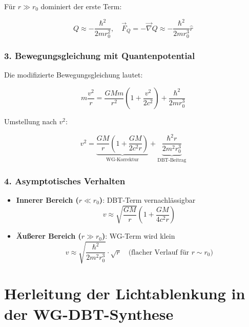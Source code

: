 Für $r \gg r_0$ dominiert der erste Term:

\begin{equation}
Q \approx -\frac{\hbar^2}{2m r_0^2}, \quad \vec{F}_Q = -\vec{\nabla}Q \approx -\frac{\hbar^2}{2m r_0^3}\hat{r}
\end{equation}

\subsubsection{3. Bewegungsgleichung mit Quantenpotential}
Die modifizierte Bewegungsgleichung lautet:

\begin{equation}
m\frac{v^2}{r} = \frac{GMm}{r^2}\left(1 + \frac{v^2}{2c^2}\right) + \frac{\hbar^2}{2m r_0^3}
\end{equation}

Umstellung nach $v^2$:

\begin{equation}
    \boxed
    {
        v^2 = \underbrace{\frac{GM}{r}\left(1 + \frac{GM}{2c^2r}\right)}_{\text{WG-Korrektur}} + \underbrace{\frac{\hbar^2 r}{2m^2 r_0^3}}_{\text{DBT-Beitrag}}
    }
\end{equation}

\subsubsection{4. Asymptotisches Verhalten}
\begin{itemize}
\item \textbf{Innerer Bereich ($r \ll r_0$)}: DBT-Term vernachlässigbar
\begin{equation}
v \approx \sqrt{\frac{GM}{r}} \left(1 + \frac{GM}{4c^2r}\right)
\end{equation}

\item \textbf{Äußerer Bereich ($r \gg r_0$)}: WG-Term wird klein
\begin{equation}
v \approx \sqrt{\frac{\hbar^2}{2m^2 r_0^3}} \cdot \sqrt{r} \quad \text{(flacher Verlauf für $r \sim r_0$)}
\end{equation}
\end{itemize}

\newpage
\section{Herleitung der Lichtablenkung in der WG-DBT-Synthese}
\label{sec:lichtablenkung}

